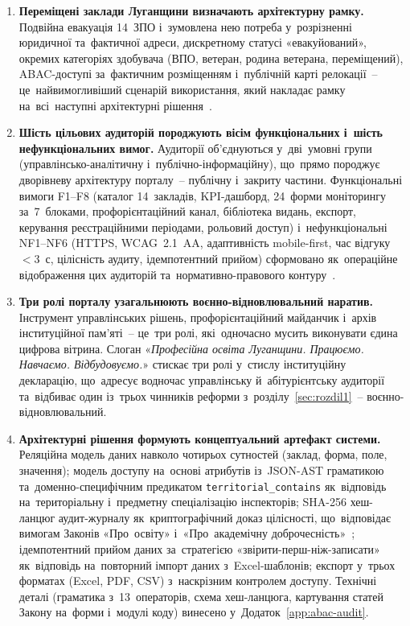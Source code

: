 \begin{enumerate}
    \item \textbf{Переміщені заклади Луганщини визначають архітектурну рамку.} Подвійна евакуація 14~ЗПО і~зумовлена нею потреба у~розрізненні юридичної та~фактичної адреси, дискретному статусі «евакуйований», окремих категоріях здобувача (ВПО, ветеран, родина ветерана, переміщений), ABAC-доступі за~фактичним розміщенням і~публічній карті релокації~-- це~найвимогливіший сценарій використання, який накладає рамку на~всі~наступні архітектурні рішення~\cite{Semenenko2023DisplacedHEI, Bazhan2025PPTERisks}.

    \item \textbf{Шість цільових аудиторій породжують вісім функціональних і~шість нефункціональних вимог.} Аудиторії об'єднуються у~дві~умовні групи (управлінсько-аналітичну і~публічно-інформаційну), що~прямо породжує дворівневу архітектуру порталу~-- публічну і~закриту частини. Функціональні вимоги F1--F8 (каталог 14~закладів, KPI-дашборд, 24~форми моніторингу за~7~блоками, профорієнтаційний канал, бібліотека видань, експорт, керування реєстраційними періодами, рольовий доступ) і~нефункціональні NF1--NF6 (HTTPS, WCAG~2.1~AA, адаптивність mobile-first, час відгуку $<3$~с, цілісність аудиту, ідемпотентний прийом) сформовано як~операційне відображення цих аудиторій та~нормативно-правового контуру~\cite{Zakon4574IX, AkademichnaDobrochesnist2024}.

    \item \textbf{Три ролі порталу узагальнюють воєнно-відновлювальний наратив.} Інструмент управлінських рішень, профорієнтаційний майданчик і~архів інституційної пам'яті~-- це~три ролі, які~одночасно мусить виконувати єдина цифрова вітрина. Слоган «\emph{Професійна освіта Луганщини. Працюємо. Навчаємо. Відбудовуємо.}» стискає три ролі у~стислу інституційну декларацію, що~адресує водночас управлінську й~абітурієнтську аудиторії та~відбиває один із~трьох чинників реформи з~розділу~\ref{sec:rozdil1}~-- воєнно-відновлювальний.

    \item \textbf{Архітектурні рішення формують концептуальний артефакт системи.} Реляційна модель даних навколо чотирьох сутностей (заклад, форма, поле, значення); модель доступу на~основі атрибутів із~JSON-AST граматикою та~доменно-специфічним предикатом \texttt{territorial\_contains} як~відповідь на~територіальну і~предметну спеціалізацію інспекторів; SHA-256 хеш-ланцюг аудит-журналу як~криптографічний доказ цілісності, що~відповідає вимогам Законів «Про~освіту» і~«Про~академічну доброчесність»~\cite{AkademichnaDobrochesnist2024}; ідемпотентний прийом даних за~стратегією «звірити-перш-ніж-записати» як~відповідь на~повторний імпорт даних з~Excel-шаблонів; експорт у~трьох форматах (Excel, PDF, CSV) з~наскрізним контролем доступу. Технічні деталі (граматика з~13~операторів, схема хеш-ланцюга, картування статей Закону на~форми і~модулі коду) винесено у~Додаток~\ref{app:abac-audit}.


\end{enumerate}
